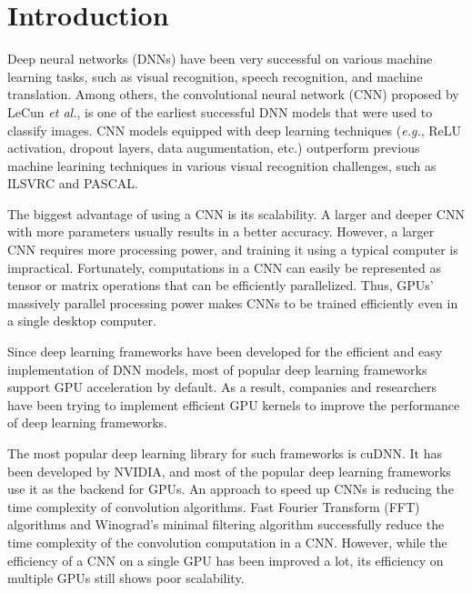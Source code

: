 \section{Introduction}

Deep neural networks (DNNs) have been very successful on various machine learning tasks, such as visual recognition\cite{krizhevsky2012imagenet,vgg,RCNN}, speech recognition\cite{speech}, and machine translation\cite{machinetranslation}. Among others, the convolutional neural network (CNN) proposed by LeCun \textit{et al.}\cite{726791}, is one of the earliest successful DNN models that were used to classify images. CNN models equipped with deep learning techniques (\textit{e.g.}, ReLU activation, dropout layers, data augumentation, etc.) outperform previous machine learining techniques in various visual recognition challenges, such as ILSVRC\cite{DBLP:journals/corr/RussakovskyDSKSMHKKBBF14} and PASCAL\cite{pascal}.


The biggest advantage of using a CNN is its scalability. A larger and deeper CNN with more parameters usually results in a better accuracy. However, a larger CNN requires more processing power, and training it using a typical computer is impractical. Fortunately, computations in a CNN can easily be represented as tensor or matrix operations that can be efficiently parallelized. Thus, GPUs' massively parallel processing power makes CNNs to be trained efficiently even in a single desktop computer.

Since deep learning frameworks have been developed for the efficient and easy implementation of DNN models, most of popular deep learning frameworks support GPU acceleration by default\cite{DBLP:journals/corr/Al-RfouAAa16,jia2014caffe,tensorflow2015-whitepaper,torch,cntk}.
As a result, companies and researchers have been trying to implement efficient GPU kernels to improve the performance of deep learning frameworks.

The most popular deep learning library for such frameworks is cuDNN\cite{cudnn}. It has been developed by NVIDIA, and most of the popular deep learning frameworks use it as the backend for GPUs. An approach to speed up CNNs is reducing the time complexity of convolution algorithms.
Fast Fourier Transform (FFT) algorithms\cite{fftconv, fbfft} and Winograd's minimal filtering algorithm\cite{winograd} successfully reduce the time complexity of the convolution computation in a CNN.
However, while the efficiency of a CNN on a single GPU has been improved a lot, its efficiency on multiple GPUs still shows poor scalability\cite{DBLP:journals/corr/YadanATR13}.

